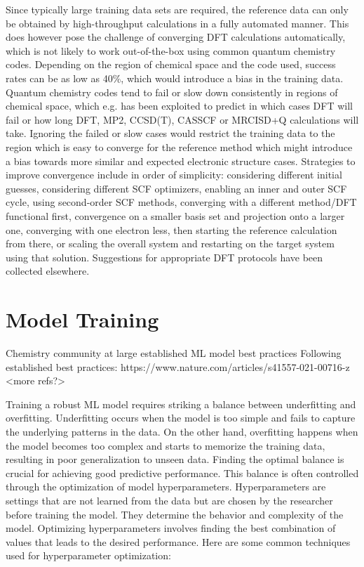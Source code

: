 \documentclass[9pt,bestpractices]{livecoms}
\begin{document}
Since typically large training data sets are required, the reference data can only be obtained by high-throughput calculations in a fully automated manner. This does however pose the challenge of converging DFT calculations automatically, which is not likely to work out-of-the-box using common quantum chemistry codes. Depending on the region of chemical space and the code used, success rates can be as low as 40\%\cite{Heinen2022}, which would introduce a bias in the training data. Quantum chemistry codes tend to fail or slow down consistently in regions of chemical space, which e.g. has been exploited to predict in which cases DFT will fail\cite{Duan2019} or how long DFT, MP2, CCSD(T), CASSCF or MRCISD+Q calculations will take\cite{Heinen2019}. Ignoring the failed or slow cases would restrict the training data to the region which is easy to converge for the reference method which might introduce a bias towards more similar and expected electronic structure cases. Strategies to improve convergence include in order of simplicity: considering different initial guesses, considering different SCF optimizers, enabling an inner and outer SCF cycle, using second-order SCF methods, converging with a different method/DFT functional first, convergence on a smaller basis set and projection onto a larger one, converging with one electron less, then starting the reference calculation from there, or scaling the overall system and restarting on the target system using that solution. Suggestions for appropriate DFT protocols have been collected elsewhere\cite{Bursch2022}.

\section{Model Training}
Chemistry community at large established ML model best practices
Following established best practices: https://www.nature.com/articles/s41557-021-00716-z
<more refs?>

Training a robust ML model requires striking a balance between underfitting and overfitting. Underfitting occurs when the model is too simple and fails to capture the underlying patterns in the data. On the other hand, overfitting happens when the model becomes too complex and starts to memorize the training data, resulting in poor generalization to unseen data. Finding the optimal balance is crucial for achieving good predictive performance. This balance is often controlled through the optimization of model hyperparameters.
Hyperparameters are settings that are not learned from the data but are chosen by the researcher before training the model. They determine the behavior and complexity of the model. Optimizing hyperparameters involves finding the best combination of values that leads to the desired performance. Here are some common techniques used for hyperparameter optimization:
\end{document}
